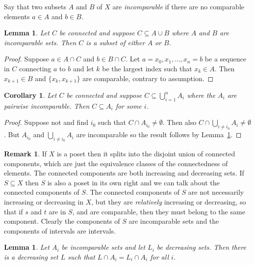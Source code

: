 \documentclass[10pt, a4paper]{article}
\theoremstyle{plain}
\newtheorem{lemma}[theorem]{Lemma}
\newtheorem{corollary}[theorem]{Corollary}
\theoremstyle{definition}
\newtheorem{remark}[theorem]{Remark}
\begin{document}
Say that two subsets $A$ and $B$ of $X$ are \emph{incomparable} if there are no
comparable elements $a\in A$ and $b\in B$.

\begin{lemma}\label{lem:two-incomparable-sets-separate}
  Let $C$ be connected and suppose $C\subseteq A\cup B$ where
  $A$ and $B$ are incomparable sets. Then $C$ is a subset of either $A$ or $B$.
\end{lemma}

\begin{proof}
  Suppose $a\in A\cap C$ and $b\in B\cap C$. Let $a=x_0, x_1, \ldots, x_n=b$
  be a sequence in $C$ connecting $a$ to $b$ and let $k$ be the largest index such
  that $x_k\in A$. Then $x_{k+1}\in B$ and $\{x_k, x_{k+1}\}$ are comparable,
  contrary to assumption.
\end{proof}

\begin{corollary}\label{cor:incomparable-sets-separate}
  Let $C$ be connected and suppose $C\subseteq \bigcup_{i=1}^n A_i$ where the $A_i$
  are pairwise incomparable. Then $C\subseteq A_i$ for some $i$.
\end{corollary}

\begin{proof}
  Suppose not and find $i_0$ such that $C\cap A_{i_0}\not=\emptyset$. Then also
  $C\cap \bigcup_{i\not= i_0} A_i \not=\emptyset$. But  $A_{i_0}$ and
  $\bigcup_{i\not= i_0} A_i$ are incomparable so the result follows
  by Lemma~\ref{lem:two-incomparable-sets-separate}.
\end{proof}

\begin{remark}\label{ref:connected-components}
  If $X$ is a poset then it splits into the disjoint union of connected
  components, which are just the equivalence classes of the connectedness of
  elements. The connected components are both increasing and decreasing sets.
  If $S\subseteq X$ then $S$ is also a poset in its own right and we can
  talk about the connected components of $S$. The connected components of
  $S$ are not necessarily increasing or decreasing in $X$, but they are
  \emph{relatively} increasing or decreasing, so that if $s$ and $t$
  are in $S$, and are comparable, then they must belong to the same component.
  Clearly the components of $S$ are incomparable sets and the components of
  intervals are intervals.
\end{remark}

\begin{lemma}\label{lem:many-to-one-across-incomparable-sets}
  Let $A_i$ be incomparable sets and let $L_i$ be decreasing sets. Then there
  is a decreasing set $L$ such that $L\cap A_i = L_i\cap A_i$ for all $i$.
\end{lemma}
\end{document}
